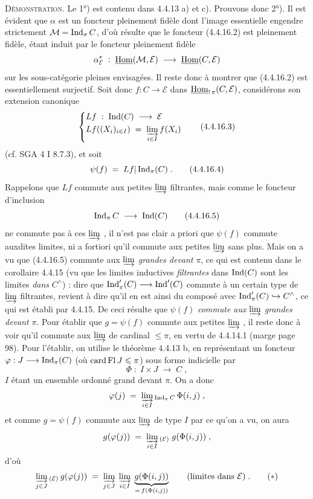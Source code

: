 \textsc{Démonstration}. Le 1°) est contenu dans 4.4.13 a) et c). Prouvons donc 2°). Il est évident que $\alpha$ est un foncteur pleinement fidèle dont l'image essentielle engendre strictement
$\mathcal{M}=\operatorname{Ind}_\pi C$, d'où résulte que le foncteur (4.4.16.2) est pleinement fidèle, étant induit par le foncteur pleinement fidèle
\[
\alpha^*_{\mathcal{E}}\;:\;\underline{\mathrm{Hom}}(\mathcal{M},\mathcal{E})\;\longrightarrow\;\underline{\mathrm{Hom}}(C,\mathcal{E})
\]
sur les sous-catégorie pleines envisagées. Il reste donc à montrer que (4.4.16.2) est essentiellement surjectif. Soit donc $f:C\longrightarrow\mathcal{E}$ dans $\underline{\mathrm{Hom}}_{!\,\pi}(C,\mathcal{E})$, considérons son extension canonique %
\[
\left\{
\begin{aligned}
&Lf\;:\;\Ind(C)\;\longrightarrow\;\mathcal{E}\\
&Lf((X_i)_{i\in I})\;=\;\varinjlim_{i\in I}f(X_i)
\end{aligned}
\right.
\tag*{(4.4.16.3)}
\]
(cf. SGA 4 I 8.7.3), et soit
\[
\psi(f)\;=\;Lf|\Ind_\pi(C)\;. \tag*{(4.4.16.4)}
\]
Rappelons que $Lf$ commute aux petites $\varinjlim$ filtrantes, mais comme le foncteur d'inclusion
\[
\Ind_\pi C\;\longrightarrow\;\Ind(C) \tag*{(4.4.16.5)}
\]
ne commute pas à ces $\varinjlim$ , il n'est pas clair a priori que $\psi(f)$ commute auxdites limites, ni a fortiori qu'il commute aux petites $\varinjlim$ sans plus. Mais on a vu que (4.4.16.5) commute aux $\varinjlim$ \textit{grandes devant} $\pi$, ce qui est contenu dans le corollaire 4.4.15 (vu que les limites inductives \textit{filtrantes} dans $\operatorname{Ind}(C)$ sont les limites \textit{dans} $C^\wedge$) : dire que $\operatorname{Ind}'_\pi(C)\longrightarrow\operatorname{Ind}'(C)$ commute à un certain type de $\varinjlim$ filtrantes, revient à dire qu'il en est ainsi du composé avec $\operatorname{Ind}'_\pi(C)\hookrightarrow C^\wedge$, ce qui est établi par 4.4.15. De ceci résulte que $\psi(f)$ \textit{commute aux} $\varinjlim$ \textit{grandes devant} $\pi$. Pour établir que $g=\psi(f)$ commute
aux petites $\varinjlim$ , il reste donc à voir qu'il commute aux $\varinjlim$ de cardinal $\leqslant\pi$, en vertu de 4.4.14.1 (marge page 98). Pour l'établir, on utilise le théorème 4.4.13 b, en représentant un foncteur $\varphi:J\longrightarrow\operatorname{Ind}_\pi(C)$ (où $\operatorname{card}\operatorname{Fl} J\leqslant\pi$) sous forme indicielle par
\[
\Phi\;:\;I\times J\;\longrightarrow\;C\;, \tag*{(4.4.16.6)}
\]
$I$ étant un ensemble ordonné grand devant $\pi$. On a donc
\[
\varphi(j)\;=\;\varinjlim_{i\in I}{}_{\operatorname{Ind}_\pi C}\,\Phi(i,j)\;,
\]
et comme $g=\psi(f)$ commute aux $\varinjlim$ de type $I$ par ce qu'on a vu, on aura
\[
g(\varphi(j))\;=\;\varinjlim_{i\in I}{}_{(\mathcal{E})}\;g(\Phi(i,j))\;,
\]
d'où
\[
\varinjlim_{j\in J}{}_{(\mathcal{E})}\,g(\varphi(j))\;=\;\varinjlim_{j\in J}\;\varinjlim_{i\in I}\;\underbrace{g(\Phi(i,j))}_{=\,f(\Phi(i,j))}\qquad\text{(limites dans $\mathcal{E}$)}\;. \tag*{$(*)$}
\]

